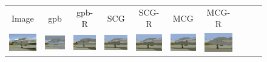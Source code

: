 \begin{figure}[tb]
\begin{center}
\begin{tabular}{cccccccccc}
\small{Image} &  \small{gpb} &  \small{gpb-R} &  \small{SCG} &  \small{SCG-R} & \small{MCG} & \small{MCG-R} \\   

 \hspace{-2mm}
\includegraphics[width=2cm]{scale-aware/fig/visual_result/visual_result_1_1.png}     \hspace{-4mm}
&\includegraphics[width=2cm]{scale-aware/fig/visual_result/visual_result_1_2.png} \hspace{-4mm}
&\includegraphics[width=2cm]{scale-aware/fig/visual_result/visual_result_1_3.png} \hspace{-4mm}
&\includegraphics[width=2cm]{scale-aware/fig/visual_result/visual_result_1_4.png} \hspace{-4mm}
&\includegraphics[width=2cm]{scale-aware/fig/visual_result/visual_result_1_5.png} \hspace{-4mm}
&\includegraphics[width=2cm]{scale-aware/fig/visual_result/visual_result_1_6.png} \hspace{-4mm}
&\includegraphics[width=2cm]{scale-aware/fig/visual_result/visual_result_1_7.png} \hspace{-4mm}

\end{tabular}
\end{center}
\end{figure}
